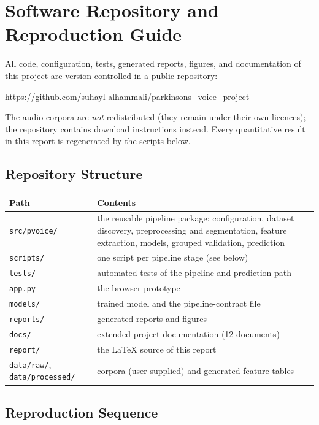 \chapter{Software Repository and Reproduction Guide}
\label{app:repro}

All code, configuration, tests, generated reports, figures, and
documentation of this project are version-controlled in a public
repository:

\begin{center}
\url{https://github.com/suhayl-alhammali/parkinsons_voice_project}
\end{center}

The audio corpora are \emph{not} redistributed (they remain under
their own licences); the repository contains download instructions
instead. Every quantitative result in this report is regenerated by
the scripts below.

\section{Repository Structure}

\begin{longtable}{p{5.2cm} p{8.8cm}}
\toprule
Path & Contents \\
\midrule
\texttt{src/pvoice/} & the reusable pipeline package: configuration,
dataset discovery, preprocessing and segmentation, feature extraction,
models, grouped validation, prediction \\
\texttt{scripts/} & one script per pipeline stage (see below) \\
\texttt{tests/} & automated tests of the pipeline and prediction path \\
\texttt{app.py} & the browser prototype \\
\texttt{models/} & trained model and the pipeline-contract file \\
\texttt{reports/} & generated reports and figures \\
\texttt{docs/} & extended project documentation (12 documents) \\
\texttt{report/} & the \LaTeX{} source of this report \\
\texttt{data/raw/}, \texttt{data/processed/} & corpora (user-supplied)
and generated feature tables \\
\bottomrule
\end{longtable}

\section{Reproduction Sequence}

